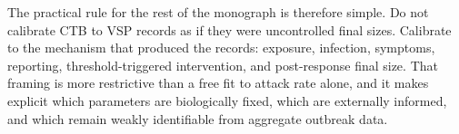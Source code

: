 The practical rule for the rest of the monograph is therefore simple. Do not calibrate CTB to VSP records as if
they were uncontrolled final sizes. Calibrate to the mechanism that produced the records: exposure, infection,
symptoms, reporting, threshold-triggered intervention, and post-response final size. That framing is more
restrictive than a free fit to attack rate alone, and it makes explicit which parameters are biologically fixed,
which are externally informed, and which remain weakly identifiable from aggregate outbreak data.
